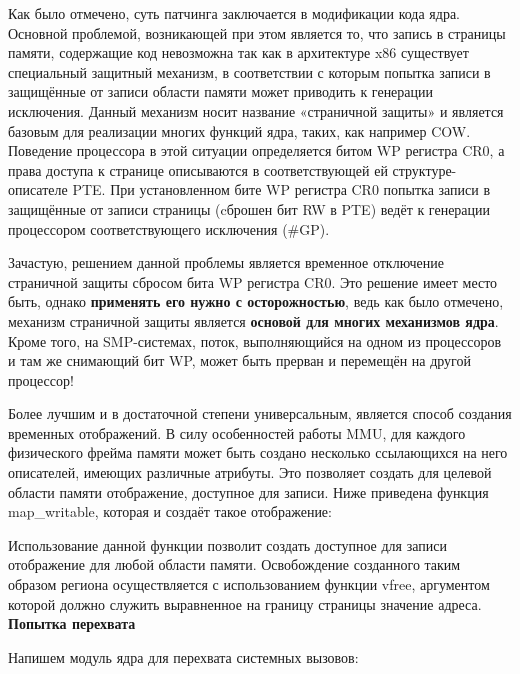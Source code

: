 \par Как было отмечено, суть патчинга заключается в модификации кода ядра. Основной проблемой, возникающей при этом является то, что запись в страницы памяти, содержащие код невозможна так как в архитектуре x86 существует специальный защитный механизм, в соответствии с которым попытка записи в защищённые от записи области памяти может приводить к генерации исключения. Данный механизм носит название «страничной защиты» и является базовым для реализации многих функций ядра, таких, как например COW. Поведение процессора в этой ситуации определяется битом WP регистра CR0, а права доступа к странице описываются в соответствующей ей структуре-описателе PTE. При установленном бите WP регистра CR0 попытка записи в защищённые от записи страницы (cброшен бит RW в PTE) ведёт к генерации процессором соответствующего исключения (\#GP).

\par Зачастую, решением данной проблемы является временное отключение страничной защиты сбросом бита WP регистра CR0. Это решение имеет место быть, однако \textbf{применять его нужно с осторожностью}, ведь как было отмечено, механизм страничной защиты является \textbf{основой для многих механизмов ядра}. Кроме того, на SMP-системах, поток, выполняющийся на одном из процессоров и там же снимающий бит WP, может быть прерван и перемещён на другой процессор!

\par Более лучшим и в достаточной степени универсальным, является способ создания временных отображений. В силу особенностей работы MMU, для каждого физического фрейма памяти может быть создано несколько ссылающихся на него описателей, имеющих различные атрибуты. Это позволяет создать для целевой области памяти отображение, доступное для записи. Ниже приведена функция map\_writable, которая и создаёт такое отображение:

\clearpage



\par Использование данной функции позволит создать доступное для записи отображение для любой области памяти. Освобождение созданного таким образом региона осуществляется с использованием функции vfree, аргументом которой должно служить выравненное на границу страницы значение адреса.\\

\textbf{Попытка перехвата}

\par Напишем модуль ядра для перехвата системных вызовов:

